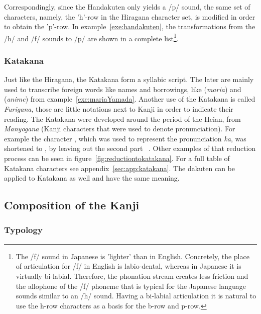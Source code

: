 Correspondingly, since the Handakuten only yields a /p/ sound, 
the same set of characters, namely, the 'h'-row in the Hiragana character set, 
is modified in order to obtain the 'p'-row. 
In example~\ref{exe:handakuten}, the transformations
from the /h/ and /f/ sounds to /p/ are shown in a complete list\footnote{
The /f/ sound in Japanese is 'lighter' than in English. Concretely, the place of
articulation for /f/ in English is labio-dental, whereas in Japanese it is 
virtually bi-labial. Therefore, the phonation stream creates less friction and
the allophone of the /f/ phoneme that is typical for the Japanese language sounds
similar to an /h/ sound. Having a bi-labial articulation it is natural to use 
the h-row characters as a basis for the b-row and p-row.}.

\subsubsection{Katakana }
\label{sec:katakana}

Just like the Hiragana, the Katakana form a syllabic script. The later are 
mainly used to transcribe foreign words like names and borrowings, 
like  (\emph{maria}) and  (\emph{anime}) from 
example~\ref{exe:mariaYamada}. Another use of the Katakana is called 
\emph{Furigana}, those are little notations next to Kanji in order to 
indicate their reading. The Katakana were developed around the period of the 
Heian, from \emph{Manyogana} (Kanji characters that were used to denote 
pronunciation).
For example the character , which was used to represent the pronunciation
\emph{ka}, was shortened to , by leaving out the second part 
~. Other examples of that reduction process
can be seen in figure~\ref{fig:reductiontokatakana}. For a full table of 
Katakana characters see appendix~\ref{sec:app:katakana}. The dakuten can be 
applied to Katakana as well and have the same meaning.

\subsection{Composition of the Kanji }
\label{sec:compositionofKanji}

\subsubsection{Typology}
\label{sec:typologyoftheKanji}

